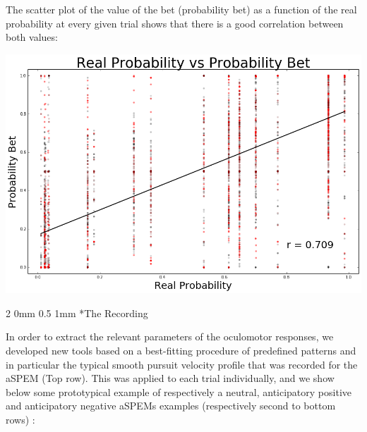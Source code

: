 \documentclass[profile,final,english, draft]{sciposter}%
\makeatletter
\renewcommand{\subsection}{\@startsection
        {subsection}%
        {2}%
        {0mm}%
        {0.5\baselineskip}%
        {1mm}%
        {\normalsize\color[rgb]{0.4,0,0}\bfseries}}%
\makeatother
\begin{document}
\begin{multicols}{3}
The scatter plot of the value of the bet (probability bet) as a function of the real probability at every given trial shows that there is a good correlation between both values:

\begin{center}
    \includegraphics[width=1\columnwidth]{p_true--p_parie}
\end{center}


\subsection*{The Recording}

In order to extract the relevant parameters of the oculomotor responses, we developed new tools based on a best-fitting procedure of predefined patterns and in particular the typical smooth pursuit velocity profile that was recorded for the aSPEM (Top row). This was applied to each trial individually, and we show below some prototypical example of respectively a neutral, anticipatory positive and anticipatory negative aSPEMs examples (respectively second to bottom rows) :


\end{multicols}
\end{document}
